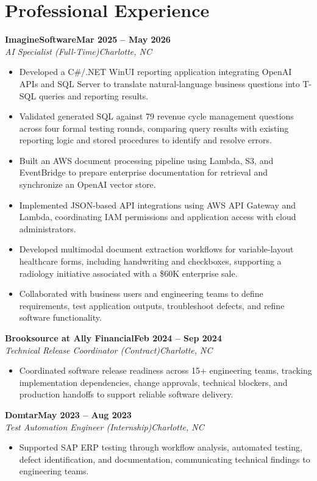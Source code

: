 \documentclass[letterpaper,11pt]{article}
\newcommand{\job}[4]{\textbf{#1}\hfill\textbf{#2}\\\textit{#3}\hfill\textit{#4}\vspace{-4pt}}
\newenvironment{bullets}{\begin{itemize}[label=$\bullet$,leftmargin=0.15in,itemsep=1pt,parsep=0pt,topsep=4pt]}{\end{itemize}\vspace{-3pt}}
\begin{document}
\section{Professional Experience}
\job{ImagineSoftware}{Mar 2025 -- May 2026}{AI Specialist (Full-Time)}{Charlotte, NC}
\begin{bullets}
\item Developed a C\#/.NET WinUI reporting application integrating OpenAI APIs and SQL Server to translate natural-language business questions into T-SQL queries and reporting results.
\item Validated generated SQL against 79 revenue cycle management questions across four formal testing rounds, comparing query results with existing reporting logic and stored procedures to identify and resolve errors.
\item Built an AWS document processing pipeline using Lambda, S3, and EventBridge to prepare enterprise documentation for retrieval and synchronize an OpenAI vector store.
\item Implemented JSON-based API integrations using AWS API Gateway and Lambda, coordinating IAM permissions and application access with cloud administrators.
\item Developed multimodal document extraction workflows for variable-layout healthcare forms, including handwriting and checkboxes, supporting a radiology initiative associated with a \$60K enterprise sale.
\item Collaborated with business users and engineering teams to define requirements, test application outputs, troubleshoot defects, and refine software functionality.
\end{bullets}
\vspace{3pt}
\job{Brooksource at Ally Financial}{Feb 2024 -- Sep 2024}{Technical Release Coordinator (Contract)}{Charlotte, NC}
\begin{bullets}
\item Coordinated software release readiness across 15+ engineering teams, tracking implementation dependencies, change approvals, technical blockers, and production handoffs to support reliable software delivery.
\end{bullets}
\vspace{3pt}
\job{Domtar}{May 2023 -- Aug 2023}{Test Automation Engineer (Internship)}{Charlotte, NC}
\begin{bullets}
\item Supported SAP ERP testing through workflow analysis, automated testing, defect identification, and documentation, communicating technical findings to engineering teams.
\end{bullets}
\end{document}
